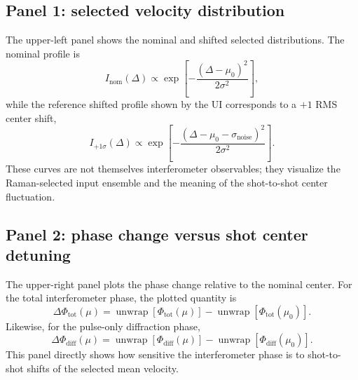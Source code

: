 \documentclass[11pt]{article}
\begin{document}
\subsection{Panel 1: selected velocity distribution}
The upper-left panel shows the nominal and shifted selected distributions. The nominal profile is
\begin{equation}
I_{\mathrm{nom}}(\Delta)
\propto
\exp\!\left[-\frac{(\Delta-\mu_0)^2}{2\sigma^2}\right],
\label{eq:nominal_distribution_plot}
\end{equation}
while the reference shifted profile shown by the UI corresponds to a $+1$ RMS center shift,
\begin{equation}
I_{+1\sigma}(\Delta)
\propto
\exp\!\left[-\frac{(\Delta-\mu_0-\sigma_{\mathrm{noise}})^2}{2\sigma^2}\right].
\label{eq:shifted_distribution_plot}
\end{equation}
These curves are not themselves interferometer observables; they visualize the Raman-selected input ensemble and the meaning of the shot-to-shot center fluctuation.

\subsection{Panel 2: phase change versus shot center detuning}
The upper-right panel plots the phase change relative to the nominal center. For the total interferometer phase, the plotted quantity is
\begin{equation}
\Delta\Phi_{\mathrm{tot}}(\mu)
=
\operatorname{unwrap}\!\left[\Phi_{\mathrm{tot}}(\mu)\right]
-
\operatorname{unwrap}\!\left[\Phi_{\mathrm{tot}}(\mu_0)\right].
\label{eq:delta_total_phase_plot}
\end{equation}
Likewise, for the pulse-only diffraction phase,
\begin{equation}
\Delta\Phi_{\mathrm{diff}}(\mu)
=
\operatorname{unwrap}\!\left[\Phi_{\mathrm{diff}}(\mu)\right]
-
\operatorname{unwrap}\!\left[\Phi_{\mathrm{diff}}(\mu_0)\right].
\label{eq:delta_diff_phase_plot}
\end{equation}
This panel directly shows how sensitive the interferometer phase is to shot-to-shot shifts of the selected mean velocity.
\end{document}
